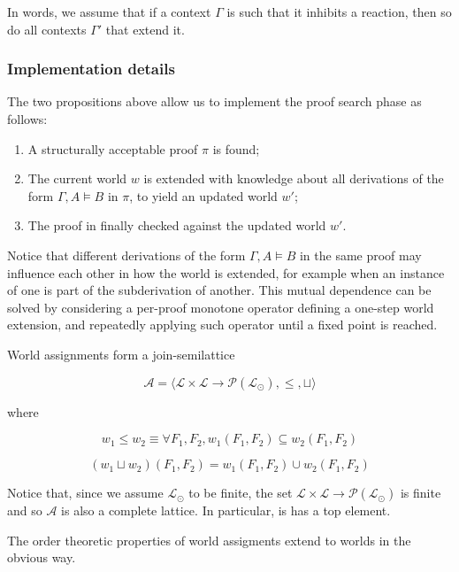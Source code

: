 In words, we assume that if a context $\Gamma$ is such that it inhibits a
reaction, then so do all contexts $\Gamma'$ that extend it.

\subsubsection{Implementation details}

The two propositions above allow us to implement the proof search phase as
follows:

\begin{enumerate}
\item A structurally acceptable proof $\pi$ is found;
\item The current world $w$ is extended with knowledge about all derivations
  of the form $\Gamma, A \models B$ in $\pi$, to yield an updated world $w'$;
\item The proof in finally checked against the updated world $w'$.
\end{enumerate}

Notice that different derivations of the form $\Gamma, A \models B$ in the same
proof may influence each other in how the world is extended, for example when an
instance of one is part of the subderivation of another. This mutual dependence
can be solved by considering a per-proof monotone operator defining a one-step
world extension, and repeatedly applying such operator until a fixed point is
reached.

\begin{definition}
  World assignments form a join-semilattice

  \[
    \mathcal{A} = \langle \mathcal{L} \times \mathcal{L} \to
    \mathcal{P}(\mathcal{L}_\odot), \leq, \sqcup \rangle
  \]

  where

  \[
    w_1 \leq w_2 \equiv \forall F_1, F_2, w_1(F_1,F_2) \subseteq w_2(F_1,F_2)
  \]

  \[
    (w_1 \sqcup w_2)(F_1, F_2) = w_1(F_1,F_2) \cup w_2(F_1,F_2)
  \]
\end{definition}

Notice that, since we assume $\mathcal{L}_{\odot}$ to be finite, the set
$\mathcal{L} \times \mathcal{L} \to \mathcal{P}(\mathcal{L}_\odot)$ is finite
and so $\mathcal{A}$ is also a complete lattice. In particular, is has a top
element.

The order theoretic properties of world assigments extend to worlds in the
obvious way.


